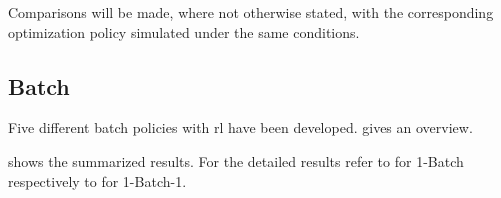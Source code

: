\documentclass{seal_thesis}
\begin{document}
Comparisons will be made, where not otherwise stated, with the corresponding optimization policy simulated under the same conditions.

\subsection{Batch}
\label{subsec:rl_batch}

Five different batch policies with \gls{rl} have been developed.  gives an overview.

\begin{table}[!ht]
\centering
{}
\caption{Overview of developed batch policies with \gls{rl}}
\label{tab:rl_batch_policies_overview}
\end{table}

 shows the summarized results. For the detailed results refer to  for 1-Batch respectively to  for 1-Batch-1.
\end{document}
